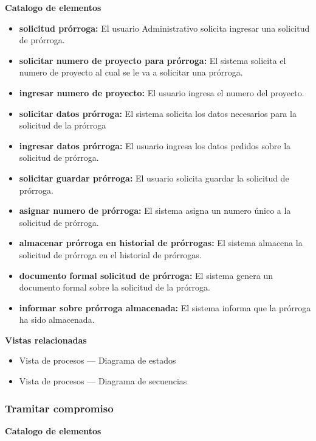 \documentclass[12pt,oneside,letterpaper]{report}
\begin{document}

\textbf{Catalogo de elementos}

\begin{itemize}
\item \textbf{solicitud prórroga:} El usuario Administrativo solicita ingresar una solicitud de prórroga.
\item \textbf{solicitar numero de proyecto para prórroga:} El sistema solicita el numero de proyecto al cual se le va a solicitar una prórroga.
\item \textbf{ingresar numero de proyecto:} El usuario ingresa el numero del proyecto.
\item \textbf{solicitar datos prórroga:} El sistema solicita los datos necesarios para la solicitud de la prórroga
\item \textbf{ingresar datos prórroga:} El usuario ingresa los datos pedidos sobre la solicitud de prórroga.
\item \textbf{solicitar guardar prórroga:} El usuario solicita guardar la solicitud de prórroga.
\item \textbf{asignar numero de prórroga:} El sistema asigna un numero único a la solicitud de prórroga.
\item \textbf{almacenar prórroga en historial de prórrogas:} El sistema almacena la solicitud de prórroga en el historial de prórrogas.
\item \textbf{documento formal solicitud de prórroga:} El sistema genera un documento formal sobre la solicitud de la prórroga.
\item \textbf{informar sobre prórroga almacenada:} El sistema informa que la prórroga ha sido almacenada.
\end{itemize}


\textbf{Vistas relacionadas}
\begin{itemize}
\item Vista de procesos --- Diagrama de estados
\item Vista de procesos --- Diagrama de secuencias
\end{itemize}


\subsubsection{Tramitar compromiso}


\textbf{Catalogo de elementos}
\end{document}
